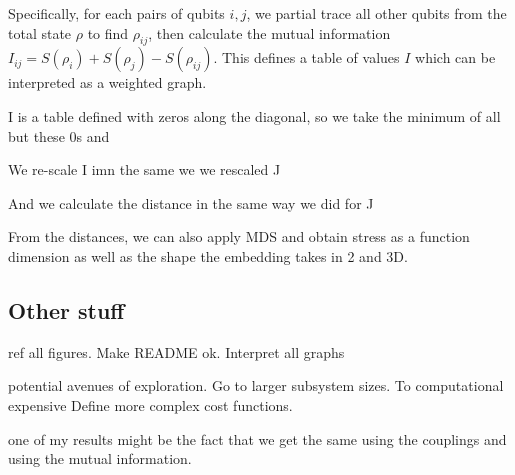 \documentclass{article}
\begin{document}
Specifically, for each pairs of qubits $i,j$, we partial trace all other qubits from the total state $\rho$ to find $\rho_{ij}$, then calculate the mutual information $I_{ij}=S(\rho_i)+S(\rho_j)-S(\rho_{ij})$.
This defines a table of values $I$ which can be interpreted as a weighted graph.

I is a table defined with zeros along the diagonal, so we take the minimum of all but these 0s and 

We re-scale I imn the same we we rescaled J

And we calculate the distance in the same way we did for J

From the distances, we can also apply MDS and obtain stress as a function dimension as well as the shape the embedding takes in 2 and 3D.

\begin{figure}
    
\end{figure}


\subsection*{Other stuff}

ref all figures.
Make README ok.
Interpret all graphs

potential avenues of exploration. 
Go to larger subsystem sizes. To computational expensive
Define more complex cost functions.

one of my results might be the fact that we get the same using the couplings and using the mutual information.
\end{document}
